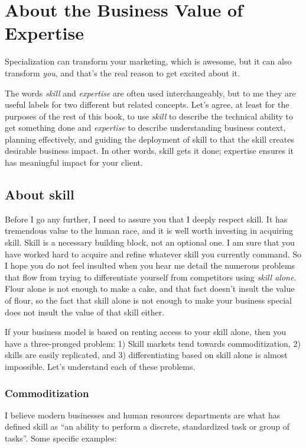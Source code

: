 \chapter{About the Business Value of Expertise}

Specialization can transform your marketing, which is awesome, but it can also transform \emph{you}, and that's the real reason to get excited about it.

The words \emph{skill} and \emph{expertise} are often used interchangeably, but to me they are useful labels for two different but related concepts. Let's agree, at least for the purposes of the rest of this book, to use \emph{skill} to describe the technical ability to get something done and \emph{expertise} to describe understanding business context, planning effectively, and guiding the deployment of skill to that the skill creates desirable business impact. In other words, skill gets it done; expertise ensures it has meaningful impact for your client.

\section{About skill}

Before I go any further, I need to assure you that I deeply respect skill. It has tremendous value to the human race, and it is well worth investing in acquiring skill. Skill is a necessary building block, not an optional one. I am sure that you have worked hard to acquire and refine whatever skill you currently command. So I hope you do not feel insulted when you hear me detail the numerous problems that flow from trying to differentiate yourself from competitors using \emph{skill alone}. Flour alone is not enough to make a cake, and that fact doesn't insult the value of flour, so the fact that skill alone is not enough to make your business special does not insult the value of that skill either.

If your business model is based on renting access to your skill alone, then you have a three-pronged problem: 1) Skill markets tend towards commoditization, 2) skills are easily replicated, and 3) differentiating based on skill alone is almost impossible. Let's understand each of these problems.

\subsection{Commoditization}

I believe modern businesses and human resources departments are what has defined skill as ``an ability to perform a discrete, standardized task or group of tasks''. Some specific examples:

